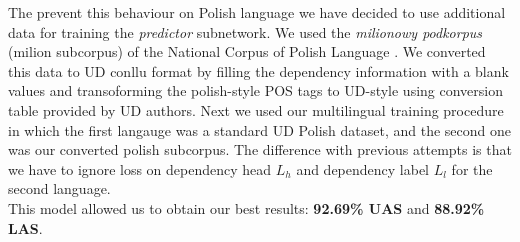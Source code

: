 The prevent this behaviour on Polish language we have decided to use additional data
for training the \emph{predictor} subnetwork. We used the \emph{milionowy podkorpus} (milion subcorpus)
of the National Corpus of Polish Language \cite{przepiorkowski_nkjp_2012}. We converted
this data to UD conllu format by filling the dependency information with a blank values
and transoforming the polish-style POS tags to UD-style using conversion table provided
by UD authors.
Next we used our multilingual training procedure in which the first langauge was
a standard UD Polish dataset, and the second one was our converted polish subcorpus.
The difference with previous attempts is that we have to ignore loss on dependency head
$L_h$ and dependency label $L_l$ for the second language.\\
This model allowed us to obtain our best results: \textbf{92.69\% UAS} and \textbf{88.92\% LAS}.
